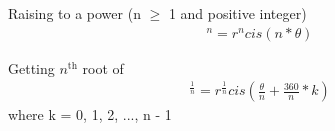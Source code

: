 \documentclass{article}
\begin{document}
	\noindent Raising to a power (n $\ge$ 1 and positive integer)
	\begin{align*}
		[r cis(\theta)]^n = r^n cis(n * \theta)
	\end{align*}

	\noindent Getting $n^\text{th}$ root of 
	\begin{align*}
		[r cis(\theta)]^\frac{1}{n} = r^\frac{1}{n} cis(\frac{\theta}{n} + \frac{360}{n} * k)
	\end{align*}
	where k = 0, 1, 2, ..., n - 1
	
	
\end{document}
